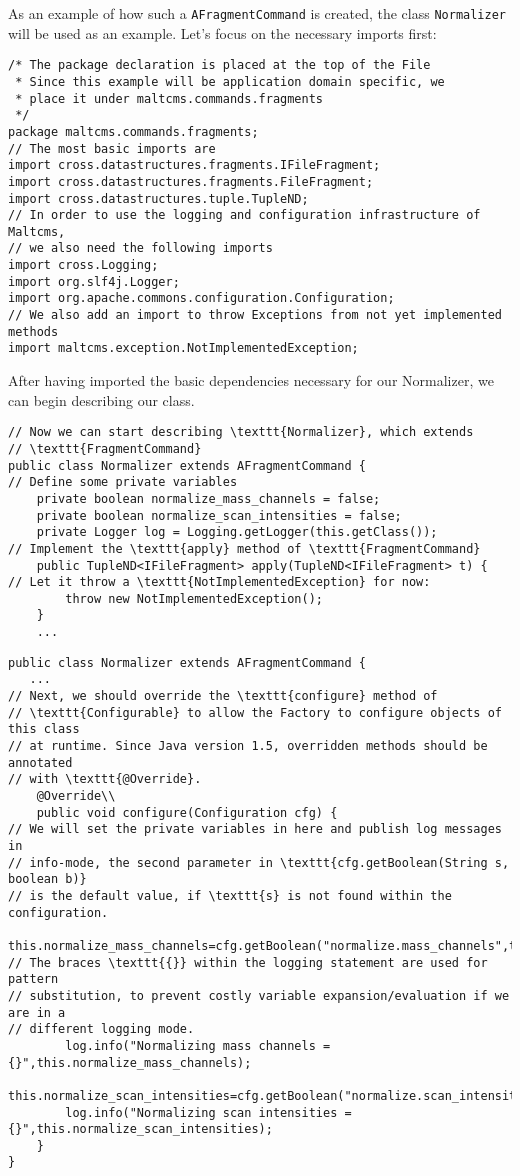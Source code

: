 \documentclass[a4paper,10pt]{article}
\begin{document}
As an example of how such a \texttt{AFragmentCommand} is created, the class
\texttt{Normalizer} will be used as an example. Let's focus on the necessary imports first:
\begin{lstlisting}
/* The package declaration is placed at the top of the File
 * Since this example will be application domain specific, we 
 * place it under maltcms.commands.fragments
 */
package maltcms.commands.fragments;
// The most basic imports are
import cross.datastructures.fragments.IFileFragment;
import cross.datastructures.fragments.FileFragment;
import cross.datastructures.tuple.TupleND;
// In order to use the logging and configuration infrastructure of Maltcms,
// we also need the following imports
import cross.Logging;
import org.slf4j.Logger;
import org.apache.commons.configuration.Configuration;
// We also add an import to throw Exceptions from not yet implemented methods
import maltcms.exception.NotImplementedException;
\end{lstlisting}
After having imported the basic dependencies necessary for our Normalizer,
we can begin describing our class.
\begin{lstlisting}
// Now we can start describing \texttt{Normalizer}, which extends 
// \texttt{FragmentCommand}
public class Normalizer extends AFragmentCommand {
// Define some private variables
	private boolean normalize_mass_channels = false;
	private boolean normalize_scan_intensities = false;
	private Logger log = Logging.getLogger(this.getClass());
// Implement the \texttt{apply} method of \texttt{FragmentCommand}
	public TupleND<IFileFragment> apply(TupleND<IFileFragment> t) {
// Let it throw a \texttt{NotImplementedException} for now:
		throw new NotImplementedException();
	}
	...
\end{lstlisting}
\begin{lstlisting}
public class Normalizer extends AFragmentCommand {
   ...
// Next, we should override the \texttt{configure} method of 
// \texttt{Configurable} to allow the Factory to configure objects of this class
// at runtime. Since Java version 1.5, overridden methods should be annotated
// with \texttt{@Override}.
	@Override\\
	public void configure(Configuration cfg) {
// We will set the private variables in here and publish log messages in 
// info-mode, the second parameter in \texttt{cfg.getBoolean(String s, boolean b)}
// is the default value, if \texttt{s} is not found within the configuration.
		this.normalize_mass_channels=cfg.getBoolean("normalize.mass_channels",true);
// The braces \texttt{{}} within the logging statement are used for pattern
// substitution, to prevent costly variable expansion/evaluation if we are in a
// different logging mode.
		log.info("Normalizing mass channels = {}",this.normalize_mass_channels);
		this.normalize_scan_intensities=cfg.getBoolean("normalize.scan_intensities",true);
		log.info("Normalizing scan intensities = {}",this.normalize_scan_intensities);
	}
}
\end{lstlisting}
\end{document}
